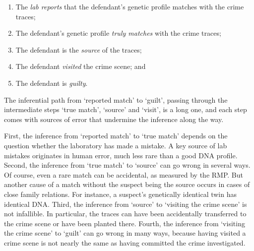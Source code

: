 \documentclass[10pt]{article}
\begin{document}
\begin{enumerate}

	\item 
The \textit{lab reports} that the defendant's 
genetic profile matches with the crime traces;

	\item 
The defendant's genetic profile \textit{truly matches} with the crime traces; 

	\item 
The defendant is the \textit{source} of the traces; 


	\item 
The defendant \textit{visited} the crime scene;  and


	\item 
The defendant is \textit{guilty}.
\end{enumerate}

\noindent
The inferential path from `reported match' 
to `guilt', passing through the intermediate steps `true match', `source' and `visit', is a long one, 
and each step comes with sources of error that undermine the inference along the way. 

First, the inference from `reported match' to `true match' depends on the question whether the laboratory has made a mistake. A key source of lab mistakes originates in human error, much less rare than a good DNA profile.
Second, the inference from `true match' to `source' can go wrong in several ways. Of course, even a rare match can be accidental, as measured by the RMP. But another cause of a match without the suspect being the source occurs in cases of close family relations. For instance, a suspect's genetically identical twin has identical DNA. %
Third, the inference from `source' to `visiting the crime scene' is not infallible. In particular, the traces can have been accidentally transferred to the crime scene or have been planted there. Fourth, the inference from `visiting the crime scene' to `guilt' can go wrong in many ways, because having visited a crime scene is not nearly the same as having committed the crime investigated.
\end{document}
